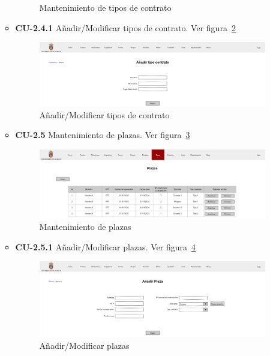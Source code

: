 \begin{itemize}
\begin{itemize}
\begin{figure}[!h]
		\caption{Mantenimiento de tipos de contrato}\label{F-CU2.4}
		\end{figure}
		\FloatBarrier
\newpage
		\item \textbf{CU-2.4.1} Añadir/Modificar tipos de contrato. Ver figura~\ref{F-CU2.4.1}
		\begin{figure}[!h]
		\centering
		\includegraphics[width=\textwidth]{../img/Anexos/Vistas/add_contrato.png}
		\caption{Añadir/Modificar tipos de contrato}\label{F-CU2.4.1}
		\end{figure}
		\FloatBarrier
		\item \textbf{CU-2.5} Mantenimiento de plazas. Ver figura~\ref{F-CU2.5}
		\begin{figure}[!h]
		\centering
		\includegraphics[width=\textwidth]{../img/Anexos/Vistas/plazas.png}
		\caption{Mantenimiento de plazas}\label{F-CU2.5}
		\end{figure}
		\FloatBarrier
\newpage
		\item \textbf{CU-2.5.1} Añadir/Modificar plazas. Ver figura~\ref{F-CU2.5.1}
		\begin{figure}[!h]
		\centering
		\includegraphics[width=\textwidth]{../img/Anexos/Vistas/add_plaza.png}
		\caption{Añadir/Modificar plazas}\label{F-CU2.5.1}
		\end{figure}

\end{itemize}
\end{itemize}
